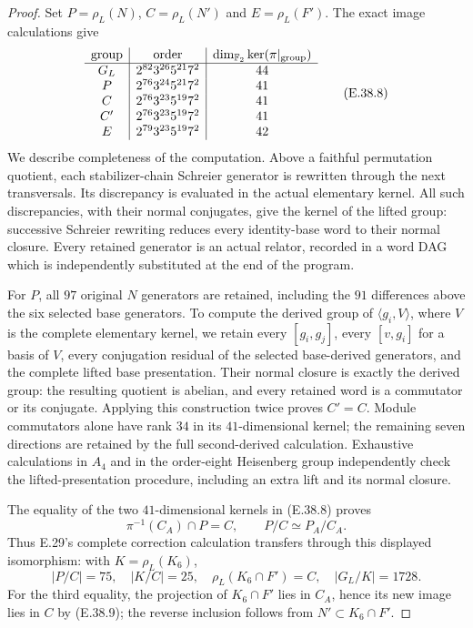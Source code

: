 \begin{proof}
Set $P=\rho_L(N)$, $C=\rho_L(N')$ and
$E=\rho_L(F')$.  The exact image calculations give
\[
 \begin{array}{c|c|c}
 \text{group}&\text{order}&
       \dim_{\mathbb F_2}\ker(\pi|_{\text{group}})\\\hline
 G_L&2^{82}3^{26}5^{21}7^2&44\\
 P&2^{76}3^{24}5^{21}7^2&41\\
 C&2^{76}3^{23}5^{19}7^2&41\\
 C'&2^{76}3^{23}5^{19}7^2&41\\
 E&2^{79}3^{23}5^{19}7^2&42
 \end{array}
 \tag{E.38.8}
\]
We describe completeness of the computation.
Above a faithful permutation quotient, each
stabilizer-chain Schreier generator is rewritten
through the next transversals.  Its discrepancy
is evaluated in the actual elementary kernel.
All such discrepancies, with their normal
conjugates, give the kernel of the lifted group:
successive Schreier rewriting reduces every
identity-base word to their normal closure.
Every retained generator is an actual relator,
recorded in a word DAG which is independently
substituted at the end of the program.

For $P$, all $97$ original $N$ generators are
retained, including the $91$ differences above
the six selected base generators.  To compute
the derived group of $\langle g_i,V\rangle$,
where $V$ is the complete elementary kernel,
we retain every $[g_i,g_j]$, every $[v,g_i]$
for a basis of $V$, every conjugation residual
of the selected base-derived generators, and
the complete lifted base presentation.
Their normal closure is exactly the derived
group: the resulting quotient is abelian,
and every retained word is a commutator or
its conjugate.  Applying this construction
twice proves $C'=C$.  Module commutators alone
have rank $34$ in its $41$-dimensional kernel;
the remaining seven directions are retained
by the full second-derived calculation.
Exhaustive calculations in $A_4$ and in the
order-eight Heisenberg group independently
check the lifted-presentation procedure,
including an extra lift and its normal closure.

The equality of the two $41$-dimensional
kernels in \textup{(E.38.8)} proves
\[
 \pi^{-1}(C_A)\cap P=C,
 \qquad P/C\simeq P_A/C_A.
 \tag{E.38.9}
\]
Thus E.29's complete correction calculation
transfers through this displayed isomorphism:
with $K=\rho_L(K_6)$,
\[
 |P/C|=75,\quad |K/C|=25,\quad
 \rho_L(K_6\cap F')=C,\quad |G_L/K|=1728.
 \tag{E.38.10}
\]
For the third equality, the projection of
$K_6\cap F'$ lies in $C_A$, hence its new
image lies in $C$ by \textup{(E.38.9)};
the reverse inclusion follows from
$N'\subset K_6\cap F'$.


\end{proof}
